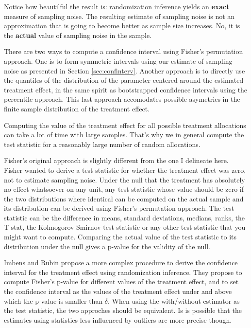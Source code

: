 \documentclass[]{book}
\theoremstyle{definition}
\theoremstyle{definition}
\theoremstyle{definition}
\theoremstyle{remark}
\let\BeginKnitrBlock\begin \let\EndKnitrBlock\end
\begin{document}
Notice how beautilful the result is: randomization inference yields an
\textbf{exact} measure of sampling noise. The resulting estimate of
sampling noise is not an approximation that is going to become better as
sample size increases. No, it is the \textbf{actual} value of sampling
noise in the sample.

There are two ways to compute a confidence interval using Fisher's
permutation approach. One is to form symmetric intervals using our
estimate of sampling noise as presented in Section \ref{sec:confinterv}.
Another approach is to directly use the quantiles of the distribution of
the parameter centered around the estimated treatment effect, in the
same spirit as bootstrapped confidence intervals using the percentile
approach. This last approach accomodates possible asymetries in the
finite sample distribution of the treatment effect.

Computing the value of the treatment effect for all possible treatment
allocations can take a lot of time with large samples. That's why we in
general compute the test statistic for a reasonably large number of
random allocations.

\BeginKnitrBlock{remark}
\iffalse{} {Remark. } \fi{}Fisher's original approach is slightly
different from the one I delineate here. Fisher wanted to derive a test
statistic for whether the treatment effect was zero, not to estimate
sampling noise. Under the null that the treatment has absolutely no
effect whatsoever on any unit, any test statistic whose value should be
zero if the two distributions where identical can be computed on the
actual sample and its distribution can be derived using Fisher's
permutation approach. The test statistic can be the difference in means,
standard deviations, medians, ranks, the T-stat, the Kolmogorov-Smirnov
test statistic or any other test statistic that you might want to
compute. Comparing the actual value of the test statistic to its
distribution under the null gives a p-value for the validity of the
null.
\EndKnitrBlock{remark}

\BeginKnitrBlock{remark}
\iffalse{} {Remark. } \fi{}Imbens and Rubin propose a more complex
procedure to derive the confidence interval for the treatment effect
using randomization inference. They propose to compute Fisher's p-value
for different values of the treatment effect, and to set the confidence
interval as the values of the treatment effect under and above which the
p-value is smaller than \(\delta\). When using the with/without
estimator as the test statistic, the two approches should be equivalent.
Is is possible that the estimates using statistics less influenced by
outliers are more precise though.
\EndKnitrBlock{remark}
\end{document}
